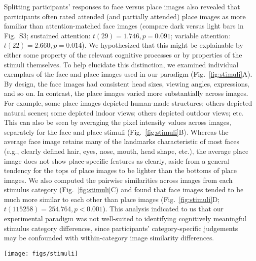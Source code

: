 \documentclass[english]{article}
\newcommand{\ratingsByCategory}{S3}
\begin{document}
Splitting participants' responses to face versus place images also revealed
that participants often rated attended (and partially attended) place images as
more familiar than attention-matched face images (compare dark versus light
bars in Fig.~\ratingsByCategory; sustained attention: $t(29) = 1.746, p =
0.091$; variable attention: $t(22) = 2.660, p = 0.014$). We hypothesized that
this might be explainable by either some property of the relevant cognitive
processes or by properties of the stimuli themselves. To help elucidate this
distinction, we examined individual exemplars of the face and place images used
in our paradigm (Fig.~\ref{fig:stimuli}A). By design, the face images had
consistent head sizes, viewing angles, expressions, and so on. In contrast, the
place images varied more substantially across images. For example, some place
images depicted human-made structures; others depicted natural scenes; some
depicted indoor views; others depicted outdoor views; etc. This can also be
seen by averaging the pixel intensity values across images, separately for the
face and place stimuli (Fig.~\ref{fig:stimuli}B). Whereas the average face
image retains many of the landmarks characteristic of most faces (e.g., clearly
defined hair, eyes, nose, mouth, head shape, etc.), the average place image
does not show place-specific features as clearly, aside from a general tendency
for the tops of place images to be lighter than the bottoms of place images. We
also computed the pairwise similarities across images from each stimulus
category (Fig.~\ref{fig:stimuli}C) and found that face images tended to be much
more similar to each other than place images (Fig.~\ref{fig:stimuli}D;
$t(115258) = 254.764, p < 0.001$). This analysis indicated to us that our
experimental paradigm was not well-suited to identifying cognitively meaningful
stimulus category differences, since participants' category-specific judgements
may be confounded with within-category image similarity differences.


\begin{figure*}[tp]
	\centering
	\texttt{[image: figs/stimuli]}
  
  \caption{\textbf{Stimulus examples and properties.} \textbf{A. Example images
  from each stimulus category.} Randomly chosen subsets of 20 face images
  (left) and 20 place images (right) are displayed. \textbf{B. Across-image
  averages.} Each panel displays the average image, taken across all 360 face
  images (left) and 360 place images (right). \textbf{C. Pairwise
  correlations.} Each row and column of the matrices displays the correlation
  (across pixels) in intensity values for one pair of face images (left) or
  place images (right). \textbf{D. Average pairwise correlations.} The bar
  heights denote the average pairwise correlations between face and place
  images. Error bars denote across-pair bootstrap-estimated 95\%
  confidence intervals.}
  
  \label{fig:stimuli}
  \end{figure*}
\end{document}
